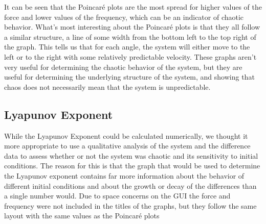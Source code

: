 \documentclass[11pt]{article} %
\begin{document}
    It can be seen that the Poincar\'e plots are the most spread for higher values of the force and lower values of the frequency, which can be
    an indicator of chaotic behavior. What's most interesting about the Poincar\'e plots is that they all follow a similar structure, a line of
    some width from the bottom left to the top right of the graph. This tells us that for each angle, the system will either move to the left or
    to the right with some relatively predictable velocity. These graphs aren't very useful for determining the chaotic behavior of the system,
    but they are useful for determining the underlying structure of the system, and showing that chaos does not necessarily mean that the system
    is unpredictable.\\
    \subsection{Lyapunov Exponent}
    While the Lyapunov Exponent could be calculated numerically, we thought it more appropriate to use a qualitative analysis of the system and
    the difference data to assess whether or not the system was chaotic and its sensitivity to initial conditions. The reason for this is that
    the graph that would be used to determine the Lyapunov exponent contains far more information about the behavior of different initial conditions
    and about the growth or decay of the differences than a single number would. Due to space concerns on the GUI the force and frequency were not
    included in the titles of the graphs, but they follow the same layout with the same values as the Poincar\'e plots
\end{document}
